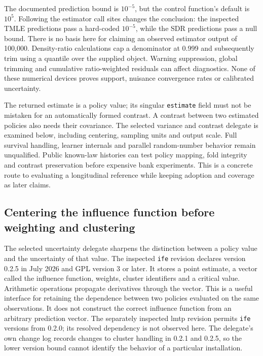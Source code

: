 The documented prediction bound is $10^{-5}$, but the control function's
default is $10^5$. Following the estimator call sites changes the conclusion:
the inspected TMLE predictions pass a hard-coded $10^{-5}$, while the SDR
predictions pass a null bound. There is no basis here for claiming an observed
estimator output of 100,000. Density-ratio calculations cap a denominator at
0.999 and subsequently trim using a quantile over the supplied object.
Warning suppression, global trimming and cumulative ratio-weighted residuals
can affect diagnostics. None of these numerical devices proves support,
nuisance convergence rates or calibrated uncertainty.
\citep{exec22_lmtp_reuse}

The returned estimate is a policy value; its singular \texttt{estimate} field
must not be mistaken for an automatically formed contrast. A contrast between
two estimated policies also needs their covariance. The selected variance
and contrast delegate is examined below, including centering, sampling units
and output scale. Full survival handling, learner internals and parallel
random-number behavior remain unqualified. Public known-law
histories can test policy mapping, fold integrity and contrast preservation
before expensive bank experiments. This is a concrete route to evaluating a
longitudinal reference while keeping adoption and coverage as later claims.

\subsection{Centering the influence function before weighting and clustering}
\label{rel23:ife-centering}

The selected uncertainty delegate sharpens the distinction between a policy
value and the uncertainty of that value. The inspected \texttt{ife} revision
declares version 0.2.5 in July 2026 and GPL version 3 or later. It stores a
point estimate, a vector called the influence function, weights, cluster
identifiers and a critical value. Arithmetic operations propagate derivatives
through the vector. This is a useful interface for retaining the dependence
between two policies evaluated on the same observations. It does not construct
the correct influence function from an arbitrary prediction vector. The
separately inspected lmtp revision permits \texttt{ife} versions from 0.2.0;
its resolved dependency is not observed here. The delegate's own change log
records changes to cluster handling in 0.2.1 and 0.2.5, so the lower version
bound cannot identify the behavior of a particular installation.
\citep{rel23ife,exec22_lmtp_reuse}

